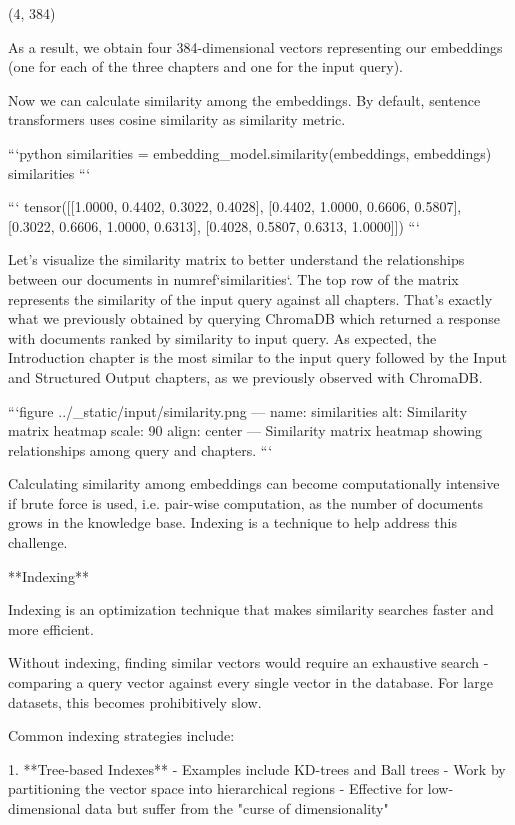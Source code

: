 {{    (4, 384)


As a result, we obtain four 384-dimensional vectors representing our embeddings (one for each of the three chapters and one for the input query).

Now we can calculate similarity among the embeddings. By default, sentence transformers uses cosine similarity as similarity metric.


```python
similarities = embedding_model.similarity(embeddings, embeddings)
similarities
```

```
tensor([[1.0000, 0.4402, 0.3022, 0.4028],
        [0.4402, 1.0000, 0.6606, 0.5807],
        [0.3022, 0.6606, 1.0000, 0.6313],
        [0.4028, 0.5807, 0.6313, 1.0000]])
```

Let's visualize the similarity matrix to better understand the relationships between our documents in {numref}`similarities`. The top row of the matrix represents the similarity of the input query against all chapters. That's exactly what we previously obtained by querying ChromaDB which returned a response with documents ranked by similarity to input query. As expected, the Introduction chapter is the most similar to the input query followed by the Input and Structured Output chapters, as we previously observed with ChromaDB.

```{figure} ../_static/input/similarity.png
---
name: similarities
alt: Similarity matrix heatmap
scale: 90%
align: center
---
Similarity matrix heatmap showing relationships among query and chapters.
``` 



Calculating similarity among embeddings can become computationally intensive if brute force is used, i.e. pair-wise computation, as the number of documents grows in the knowledge base. Indexing is a technique to help address this challenge.

**Indexing**

Indexing is an optimization technique that makes similarity searches faster and more efficient.

Without indexing, finding similar vectors would require an exhaustive search - comparing a query vector against every single vector in the database. For large datasets, this becomes prohibitively slow.

Common indexing strategies include:

1. **Tree-based Indexes**
   - Examples include KD-trees and Ball trees
   - Work by partitioning the vector space into hierarchical regions
   - Effective for low-dimensional data but suffer from the "curse of dimensionality"

}}
